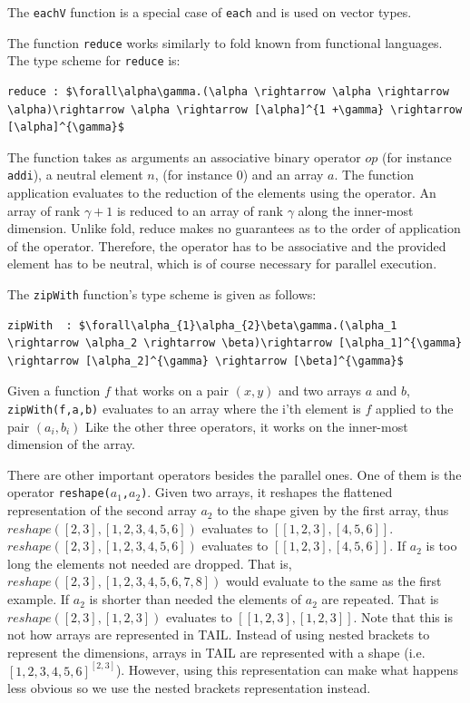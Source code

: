 \documentclass[11pt]{article}
\begin{document}
The {\tt eachV} function is a special case of {\tt each} and is used on vector types.

The function {\tt reduce} works similarly to fold known from functional languages. The type scheme for {\tt reduce} is:
\begin{lstlisting}[numbers=none,frame=none]
reduce : $\forall\alpha\gamma.(\alpha \rightarrow \alpha \rightarrow \alpha)\rightarrow \alpha \rightarrow [\alpha]^{1 +\gamma} \rightarrow [\alpha]^{\gamma}$
\end{lstlisting}
The function takes as arguments an associative binary operator $op$ (for instance {\tt addi}), a neutral element $n$, (for instance 0) and an array $a$.
The function application evaluates to the reduction of the elements using the operator.
An array of rank $\gamma+1$ is reduced to an array of rank $\gamma$ along the inner-most dimension.
Unlike fold, reduce makes no guarantees as to the order of application of the operator.
Therefore, the operator has to be associative and the provided element has to be neutral, which is of course necessary for parallel execution.

The {\tt zipWith} function's type scheme is given as follows: 
\begin{lstlisting}[numbers=none,frame=none]
zipWith  : $\forall\alpha_{1}\alpha_{2}\beta\gamma.(\alpha_1 \rightarrow \alpha_2 \rightarrow \beta)\rightarrow [\alpha_1]^{\gamma} \rightarrow [\alpha_2]^{\gamma} \rightarrow [\beta]^{\gamma}$
\end{lstlisting}
Given a function $f$ that works on a pair $(x,y)$ and two arrays $a$ and $b$, {\tt zipWith(f,a,b)}  evaluates to an array where the i'th element is $f$ applied to the pair $(a_i,b_i)$ 
Like the other three operators, it works on the inner-most dimension of the array\cite{ElsmanDybdal:Array:2014}.

There are other important operators besides the parallel ones. One of them is the operator {\tt reshape($a_1$,$a_2$)}.
Given two arrays, it reshapes the flattened representation of the second array $a_2$ to the shape given by the first array, thus $reshape([2,3],[1,2,3,4,5,6])$ evaluates to $[[1,2,3],[4,5,6]]$. 
$reshape([2,3],[1,2,3,4,5,6])$ evaluates to $[[1,2,3],[4,5,6]]$. 
If $a_2$ is too long the elements not needed are dropped. That is, $reshape([2,3],[1,2,3,4,5,6,7,8])$ would evaluate to the same as the first example.
If $a_2$ is shorter than needed the elements of $a_2$ are repeated.
That is $reshape([2,3],[1,2,3])$ evaluates to $[[1,2,3],[1,2,3]]$.
Note that this is not how arrays are represented in TAIL.
Instead of using nested brackets to represent the dimensions, arrays in TAIL are represented with a shape 
(i.e. $[1,2,3,4,5,6]^{[2,3]}$).
However, using this representation can make what happens less obvious so we use the nested brackets representation instead. 
\end{document}

